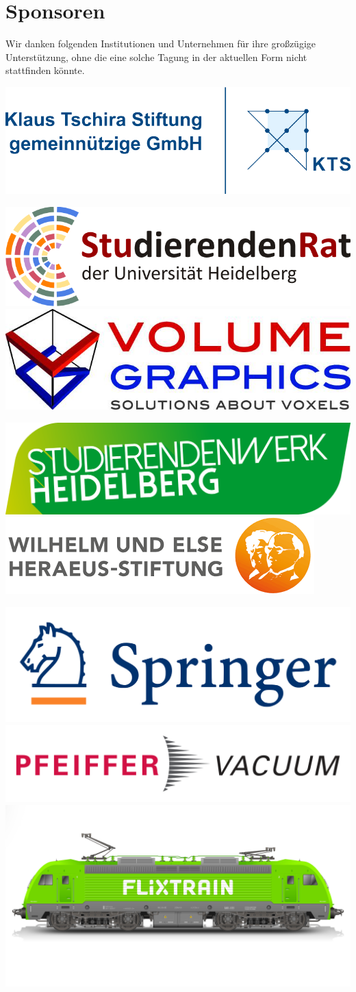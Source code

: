 
\pagebreak
\section{Sponsoren}
\small Wir danken folgenden Institutionen und Unternehmen für ihre großzügige Unterstützung, ohne die eine solche Tagung in der aktuellen Form nicht stattfinden könnte.

\centering\includegraphics[width=.95\textwidth]{media/ktslogo}

\vspace{5mm}

\includegraphics[width=.47\textwidth]{media/StuRa}
\hfill
\includegraphics[width=.47\textwidth]{media/volumegraphics}

\vspace{7mm}

\includegraphics[width=.48\textwidth]{media/stuwe}
\hfill
\includegraphics[width=.48\textwidth]{media/heraeus}

\vspace{3mm}

\includegraphics[width=.31\textwidth]{media/springer}
\hfill
\includegraphics[width=.38\textwidth]{media/pfeiffer}
\hfill
\includegraphics[width=.27\textwidth]{media/flixtrain}

